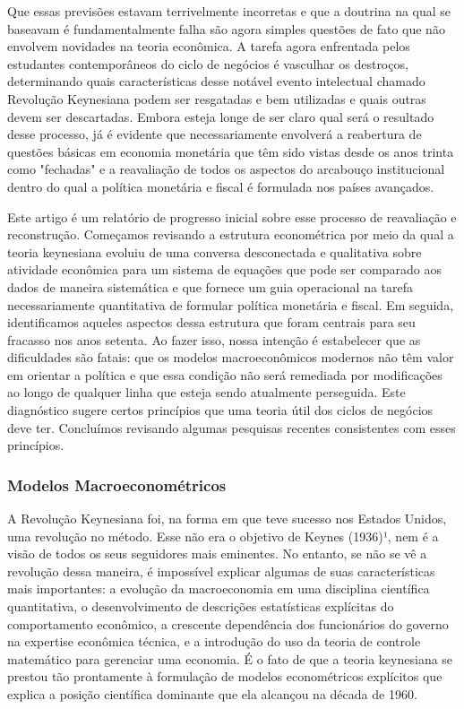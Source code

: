 \documentclass[12pt]{article}
\begin{document}
Que essas previsões estavam terrivelmente incorretas e que a doutrina na qual se baseavam é fundamentalmente falha são agora simples questões de fato que não envolvem novidades na teoria econômica. A tarefa agora enfrentada pelos estudantes contemporâneos do ciclo de negócios é vasculhar os destroços, determinando quais características desse notável evento intelectual chamado Revolução Keynesiana podem ser resgatadas e bem utilizadas e quais outras devem ser descartadas. Embora esteja longe de ser claro qual será o resultado desse processo, já é evidente que necessariamente envolverá a reabertura de questões básicas em economia monetária que têm sido vistas desde os anos trinta como "fechadas" e a reavaliação de todos os aspectos do arcabouço institucional dentro do qual a política monetária e fiscal é formulada nos países avançados.

Este artigo é um relatório de progresso inicial sobre esse processo de reavaliação e reconstrução. Começamos revisando a estrutura econométrica por meio da qual a teoria keynesiana evoluiu de uma conversa desconectada e qualitativa sobre atividade econômica para um sistema de equações que pode ser comparado aos dados de maneira sistemática e que fornece um guia operacional na tarefa necessariamente quantitativa de formular política monetária e fiscal. Em seguida, identificamos aqueles aspectos dessa estrutura que foram centrais para seu fracasso nos anos setenta. Ao fazer isso, nossa intenção é estabelecer que as dificuldades são fatais: que os modelos macroeconômicos modernos não têm valor em orientar a política e que essa condição não será remediada por modificações ao longo de qualquer linha que esteja sendo atualmente perseguida. Este diagnóstico sugere certos princípios que uma teoria útil dos ciclos de negócios deve ter. Concluímos revisando algumas pesquisas recentes consistentes com esses princípios.

\subsubsection{\textbf{Modelos Macroeconométricos}}

A Revolução Keynesiana foi, na forma em que teve sucesso nos Estados Unidos, uma revolução no método. Esse não era o objetivo de Keynes (1936)¹, nem é a visão de todos os seus seguidores mais eminentes. No entanto, se não se vê a revolução dessa maneira, é impossível explicar algumas de suas características mais importantes: a evolução da macroeconomia em uma disciplina científica quantitativa, o desenvolvimento de descrições estatísticas explícitas do comportamento econômico, a crescente dependência dos funcionários do governo na expertise econômica técnica, e a introdução do uso da teoria de controle matemático para gerenciar uma economia. É o fato de que a teoria keynesiana se prestou tão prontamente à formulação de modelos econométricos explícitos que explica a posição científica dominante que ela alcançou na década de 1960.
\end{document}
